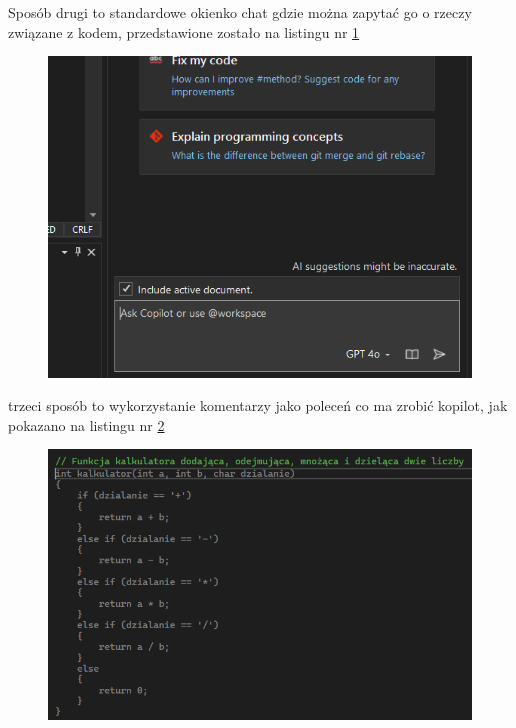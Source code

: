 Sposób drugi to standardowe okienko chat gdzie można zapytać go o rzeczy związane z kodem, przedstawione zostało na listingu nr \ref{fig:copilotchat}

\begin{figure}[H]
	\centering
	\includegraphics[width=1\linewidth]{images/CopilotChat}
	\caption{}
	\label{fig:copilotchat}
\end{figure}

trzeci sposób to wykorzystanie komentarzy jako poleceń co ma zrobić kopilot, jak pokazano na listingu nr \ref{fig:copilotcomments}

\begin{figure}[H]
	\centering
	\includegraphics[width=1\linewidth]{images/CopilotComments}
	\caption{}
	\label{fig:copilotcomments}
\end{figure}



